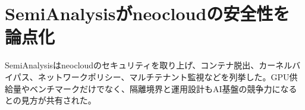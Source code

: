 \section{SemiAnalysisがneocloudの安全性を論点化}
SemiAnalysisはneocloudのセキュリティを取り上げ、コンテナ脱出、カーネルバイパス、ネットワークポリシー、マルチテナント監視などを列挙した。GPU供給量やベンチマークだけでなく、隔離境界と運用設計もAI基盤の競争力になるとの見方が共有された。
